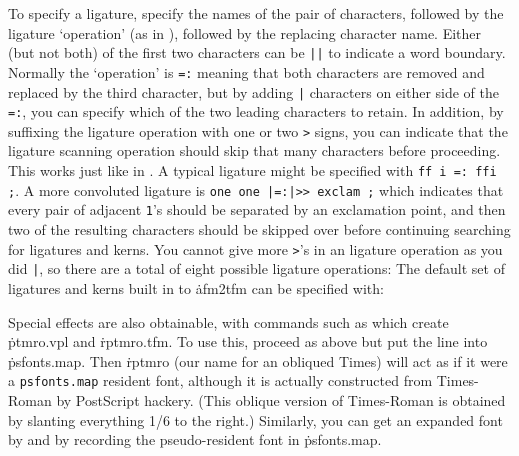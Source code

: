 To specify a ligature, specify the names of the pair of characters,
followed by the ligature `operation' (as in \MF), followed by the
replacing character name.  Either (but not both) of the first two
characters can be {\tt ||} to indicate a word boundary.
Normally the `operation' is {\tt =:}
meaning that both characters are removed and replaced by the
third character, but by adding {\tt |} characters on either side of
the {\tt =:}, you can specify which of the two leading characters to
retain.  In addition, by suffixing the ligature operation with one
or two {\tt >} signs, you can indicate that the ligature scanning
operation should skip that many characters before proceeding.  This
works just like in \MF.  A typical ligature might be specified with
{\tt ff i =:{} ffi ;}.  A more convoluted ligature is
{\tt one one |=:|>> exclam ;} which indicates that every pair of
adjacent {\tt 1}'s should be separated by an exclamation point,
and then two of the resulting characters should be skipped over
before continuing searching for ligatures and kerns.  You cannot
give more {\tt >}'s in an ligature operation as you did {\tt |},
so there are a total of eight possible ligature operations:
\cmd{=: |=: |=:> =:| =:|> |=:| |=:|> |=:|>>}
\noindent
The default set of ligatures and kerns built in to \.{afm2tfm} can
be specified with:
{\vskip0pt\parskip=0pt
\endverb}


Special effects are also obtainable, with commands such as
\noindent
which create \.{ptmro.vpl} and \.{rptmro.tfm}.
To use this, proceed as above but put the line
\noindent
into \.{psfonts.map}.  Then \.{rptmro} (our name for an obliqued Times)
will act as if it were a
\^{{\tt psfonts.map}}
resident font, although it is actually constructed from Times-Roman
by PostScript hackery.   (This oblique version of Times-Roman is obtained
by slanting everything 1/6 to the right.)
Similarly, you can get an expanded font by
\noindent
and by recording the pseudo-resident font
\noindent
in \.{psfonts.map}.

